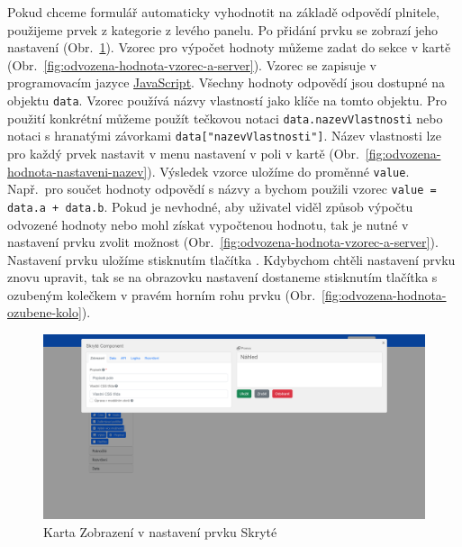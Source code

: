 Pokud chceme formulář automaticky vyhodnotit na základě odpovědí plnitele, použijeme prvek  z kategorie  z levého panelu.
Po přidání prvku se zobrazí jeho nastavení (Obr.~\ref{fig:odvozena-hodnota-nastaveni}).
Vzorec pro výpočet hodnoty můžeme zadat do sekce  v kartě  (Obr.~\ref{fig:odvozena-hodnota-vzorec-a-server}).
Vzorec se zapisuje v programovacím jazyce \href{https://developer.mozilla.org/en-US/docs/Web/JavaScript}{JavaScript}.
Všechny hodnoty odpovědí jsou dostupné na objektu \lstinline{data}.
Vzorec používá názvy vlastností jako klíče na tomto objektu.
Pro použití konkrétní můžeme použít tečkovou notaci \lstinline{data.nazevVlastnosti} nebo notaci s hranatými závorkami \lstinline{data["nazevVlastnosti"]}.
Název vlastnosti lze pro každý prvek nastavit v menu nastavení v poli  v kartě  (Obr.~\ref{fig:odvozena-hodnota-nastaveni-nazev}).
Výsledek vzorce uložíme do proměnné \lstinline{value}.
Např.\ pro součet hodnoty odpovědí s názvy  a  bychom použili vzorec \lstinline{value = data.a + data.b}.
Pokud je nevhodné, aby uživatel viděl způsob výpočtu odvozené hodnoty nebo mohl získat vypočtenou hodnotu, tak je nutné v nastavení prvku zvolit možnost  (Obr.~\ref{fig:odvozena-hodnota-vzorec-a-server}).
Nastavení prvku uložíme stisknutím tlačítka .
Kdybychom chtěli nastavení prvku znovu upravit, tak se na obrazovku nastavení dostaneme stisknutím tlačítka s ozubeným kolečkem v pravém horním rohu prvku (Obr.~\ref{fig:odvozena-hodnota-ozubene-kolo}).

\begin{figure}[H]
    \centering
    \includegraphics[width=\textwidth]{../img/screenshots/odvozena-hodnota-nastaveni}
    \caption{Karta Zobrazení v nastavení prvku Skryté}\label{fig:odvozena-hodnota-nastaveni}
\end{figure}

